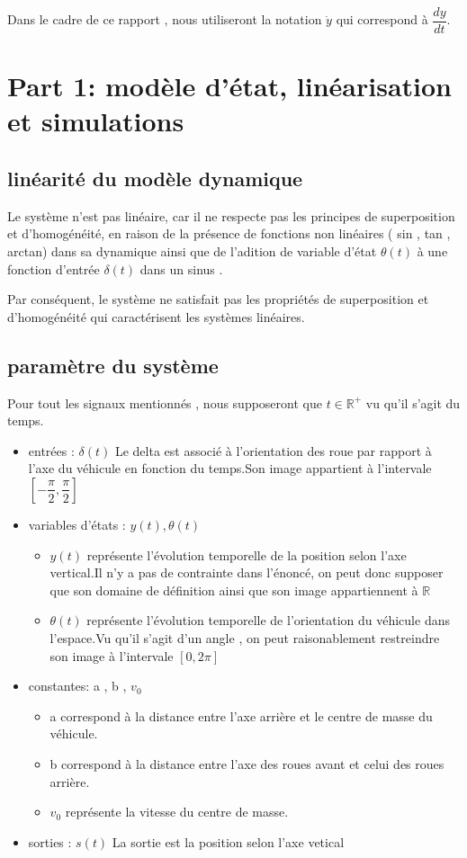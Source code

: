 \documentclass[11pt,a4paper]{article}
\begin{document}

\begin{displayquote}
Dans le cadre de ce rapport , nous utiliseront la notation $\dot y$ qui correspond à $\dfrac{d y}{dt}$.
\end{displayquote}
\section{Part 1: modèle d'état, linéarisation et simulations}
\subsection{linéarité du modèle dynamique}
Le système n’est pas linéaire, car il ne respecte pas les principes de superposition et d’homogénéité, en raison de la présence de fonctions non linéaires ( sin , tan , arctan) dans sa dynamique ainsi que de l'adition de variable d'état $\theta(t)$ à une fonction d'entrée $\delta(t)$ dans un sinus .

Par conséquent, le système ne satisfait pas les propriétés de superposition et d’homogénéité qui caractérisent les systèmes linéaires.
\subsection{paramètre du système}
Pour tout les signaux mentionnés , nous supposeront que $t \in \mathbb{R}^+$ vu qu'il s'agit du temps.
\begin{itemize}
	\item entrées : $\delta(t)$
	      Le delta est associé à l'orientation des roue par rapport à l'axe du véhicule en fonction du temps.Son image appartient à l'intervale $[-\dfrac{\pi}{2},\dfrac{\pi}{2}]$
	\item variables d'états : $y(t),\theta(t)$
    \begin{itemize}
      \item $y(t)$ représente l'évolution temporelle de la position selon l'axe vertical.Il n'y a pas de contrainte dans l'énoncé, on peut donc supposer que son domaine de définition ainsi que son image appartiennent à $\mathbb{R}$
      \item $\theta(t)$ représente l'évolution temporelle de l'orientation du véhicule dans l'espace.Vu qu'il s'agit d'un angle , on peut raisonablement restreindre son image à l'intervale $ [ 0 , 2\pi]$
    \end{itemize}
	\item constantes: a , b , $v_0$ \begin{itemize}
	 \item 
    a correspond à la distance entre l'axe arrière et le centre de masse du véhicule. 
    \item b correspond à la distance entre l'axe des roues avant et celui des roues arrière.
    \item $v_0$ représente la vitesse du centre de masse.

	\end{itemize}
	\item sorties : $s(t)$
	      La sortie est la position selon l'axe vetical
\end{itemize}
\end{document}
